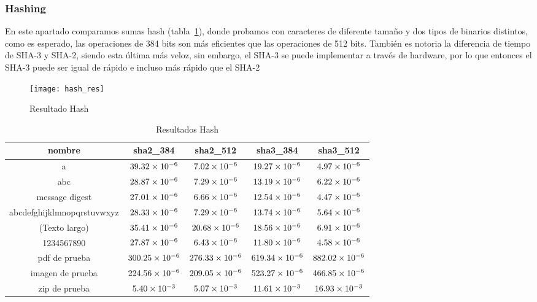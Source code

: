 \documentclass[../main.tex]{subfiles}
\begin{document}
\newpage{}

\subsubsection{Hashing}\label{sec:hash}

En este apartado comparamos sumas hash (tabla~\ref{tab:hash-res}), donde probamos con caracteres de diferente tamaño
y dos tipos de binarios distintos, como es esperado, las operaciones de 384 bits son más eficientes
que las operaciones de 512 bits. También es notoria la diferencia de tiempo de SHA-3 y SHA-2, siendo esta
última más veloz, sin embargo, el SHA-3 se puede implementar a través de hardware, por lo que
entonces el SHA-3 puede ser igual de rápido e incluso más rápido que el SHA-2

\begin{figure}[ht]
  \centering
  \texttt{[image: hash\_res]}
  \caption{Resultado Hash}\label{fig:hash}
\end{figure}

\begin{table}[ht]
  \centering
  \caption{Resultados Hash}\label{tab:hash-res}
  \begin{tabular}{|c|c|c|c|c|}
    \hline
    \rowcolor[HTML]{000000}
    {\color[HTML]{FFFFFF} nombre} & {\color[HTML]{FFFFFF} sha2\_384} & {\color[HTML]{FFFFFF} sha2\_512} & {\color[HTML]{FFFFFF} sha3\_384} & {\color[HTML]{FFFFFF} sha3\_512} \\ \hline
    a                          & $\num{39.32E-06}$  & $\num{7.02E-06 }$  & $\num{19.27E-06}$  & $\num{4.97E-06}$   \\ \hline
    \rowcolor[HTML]{C0C0C0}
    abc                        & $\num{28.87E-06}$  & $\num{7.29E-06 }$  & $\num{13.19E-06}$  & $\num{6.22E-06}$   \\ \hline
    message digest             & $\num{27.01E-06}$  & $\num{6.66E-06 }$  & $\num{12.54E-06}$  & $\num{4.47E-06}$   \\ \hline
    \rowcolor[HTML]{C0C0C0}
    abcdefghijklmnopqrstuvwxyz & $\num{28.33E-06}$  & $\num{7.29E-06 }$  & $\num{13.74E-06}$  & $\num{5.64E-06}$   \\ \hline
    (Texto largo)              & $\num{35.41E-06}$  & $\num{20.68E-06}$  & $\num{18.56E-06}$  & $\num{6.91E-06}$   \\ \hline
    \rowcolor[HTML]{C0C0C0}
    1234567890                 & $\num{27.87E-06}$  & $\num{6.43E-06 }$  & $\num{11.80E-06}$  & $\num{4.58E-06}$   \\ \hline
    pdf de prueba              & $\num{300.25E-06}$ & $\num{276.33E-06}$ & $\num{619.34E-06}$ & $\num{882.02E-06}$ \\ \hline
    \rowcolor[HTML]{C0C0C0}
    imagen de prueba           & $\num{224.56E-06}$ & $\num{209.05E-06}$ & $\num{523.27E-06}$ & $\num{466.85E-06}$ \\ \hline
    zip de prueba              & $\num{5.40E-03 }$  & $\num{5.07E-03 }$  & $\num{11.61E-03}$  & $\num{16.93E-03}$  \\ \hline
  \end{tabular}
\end{table}
\end{document}

